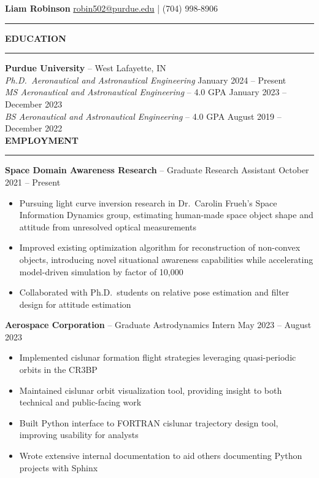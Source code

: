 \documentclass[11pt, a4paper]{article}
\newcommand{\sectiontitle}[1]{{\Large \textbf{#1}}\vspace{0.5em}\hrule\vspace{0.5em}}
\begin{document}
\thispagestyle{empty}

\sffamily

\noindent
\textbf{\huge Liam Robinson} \hfill \href{mailto:robin502@purdue.edu}{robin502@purdue.edu} | (704) 998-8906
\rule{\linewidth}{4pt}
\vspace{-0.5em}

\sectiontitle{EDUCATION}
\textbf{Purdue University} -- West Lafayette, IN \\
\textit{Ph.D.\ Aeronautical and Astronautical Engineering} \hfill January 2024 -- Present \\
\textit{MS Aeronautical and Astronautical Engineering} -- 4.0 GPA \hfill January 2023 -- December 2023 \\
\textit{BS Aeronautical and Astronautical Engineering} -- 4.0 GPA \hfill August 2019 -- December 2022 \\

\sectiontitle{EMPLOYMENT}
\textbf{Space Domain Awareness Research} -- Graduate Research Assistant \hfill October 2021 -- Present
\begin{itemize}[noitemsep]
    \item Pursuing light curve inversion research in Dr.\ Carolin Frueh's Space Information Dynamics group,
    estimating human-made space object shape and attitude from unresolved optical measurements
    \item Improved existing optimization algorithm for reconstruction of non-convex objects, introducing novel
    situational awareness capabilities while accelerating model-driven simulation by factor of 10,000
    \item Collaborated with Ph.D.\ students on relative pose estimation and filter design for attitude estimation
\end{itemize}

\textbf{Aerospace Corporation} -- Graduate Astrodynamics Intern \hfill May 2023 -- August 2023
\begin{itemize}[noitemsep]
    \item Implemented cislunar formation flight strategies leveraging quasi-periodic orbits in the CR3BP
    \item Maintained cislunar orbit visualization tool, providing insight to both technical and public-facing work
    \item Built Python interface to FORTRAN cislunar trajectory design tool, improving usability for analysts
    \item Wrote extensive internal documentation to aid others documenting Python projects with Sphinx
\end{itemize}
\end{document}
